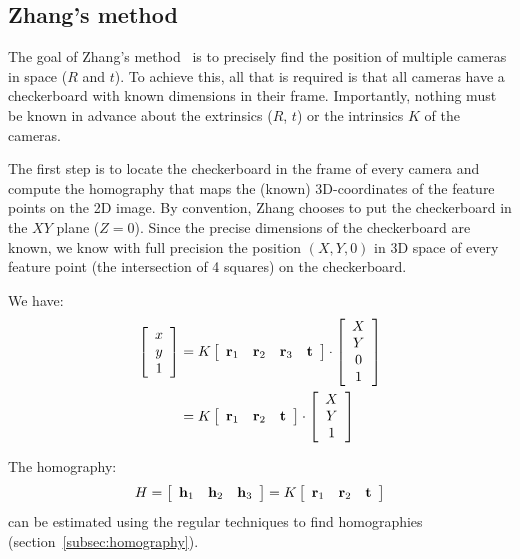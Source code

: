 \subsection{Zhang's method}\label{subsec:zhangsmethod}

The goal of Zhang's method~\citep{zhang} is to precisely find the position of multiple cameras in space ($R$ and $t$).
To achieve this, all that is required is that all cameras have a checkerboard with known dimensions in their frame.
Importantly, nothing must be known in advance about the extrinsics ($R$, $t$) or the intrinsics $K$ of the cameras.

The first step is to locate the checkerboard in the frame of every camera and compute the homography that maps the
(known) 3D-coordinates of the feature points on the 2D image.
By convention, Zhang chooses to put the checkerboard in the $XY$ plane ($Z=0$).
Since the precise dimensions of the checkerboard are known, we know with full precision the position $(X,Y,0)$ in 3D
space of every feature point (the intersection of 4 squares) on the checkerboard.

We have:
\begin{align*}
    \left[\begin{array}{c}
              x \\ y \\ 1
    \end{array}\right] &= K\left[
    \begin{array}{c c c c}
        \textbf{r}_1 & \textbf{r}_2 & \textbf{r}_3 & \textbf{t}
    \end{array}\right]\cdot
    \left[\begin{array}{c}
              X \\ Y \\ 0 \\ 1
    \end{array}\right]\\
    &=K\left[
    \begin{array}{c c c}
        \textbf{r}_1 & \textbf{r}_2 & \textbf{t}
    \end{array}\right]\cdot
    \left[\begin{array}{c}
              X \\ Y \\ 1
    \end{array}\right]
\end{align*}

The homography:
\[H=\left[\begin{array}{c c c}
        \textbf{h}_1 & \textbf{h}_2 & \textbf{h}_3
    \end{array}\right]=K\left[\begin{array}{c c c}
        \textbf{r}_1 & \textbf{r}_2 & \textbf{t}
    \end{array}\right]\]
can be estimated using the regular techniques to find homographies (section~\ref{subsec:homography}).

